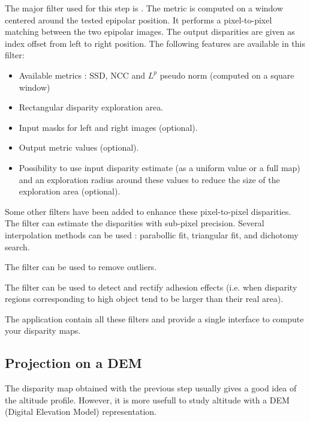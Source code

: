The major filter used for this step is .
The metric is computed on a window centered around the tested epipolar position. 
It performs a pixel-to-pixel matching between the two epipolar images. The output disparities
are given as index offset from left to right position. The following features are available 
in this filter:
\begin{itemize}
\item Available metrics : SSD, NCC and $L^{p}$ pseudo norm (computed on a square window)
\item Rectangular disparity exploration area.
\item Input masks for left and right images (optional).
\item Output metric values (optional).
\item Possibility to use input disparity estimate (as a uniform value or a full map) and an exploration radius around 
these values to reduce the size of the exploration area (optional).
\end{itemize}

Some other filters have been added to enhance these pixel-to-pixel disparities. The filter
 can estimate the disparities with sub-pixel 
precision. Several interpolation methods can be used : parabollic fit, triangular fit, and 
dichotomy search.

The filter  can be used to remove outliers.

The filter  can be used to detect and rectify
adhesion effects (i.e. when disparity regions corresponding to high object tend to be larger than their real area).

The application  contain all these filters and 
provide a single interface to compute your disparity maps.

\subsection{Projection on a DEM}
The disparity map obtained  with the previous step usually gives a good idea of 
the altitude profile. However, it is more usefull to study altitude with a DEM (Digital 
Elevation Model) representation. 

